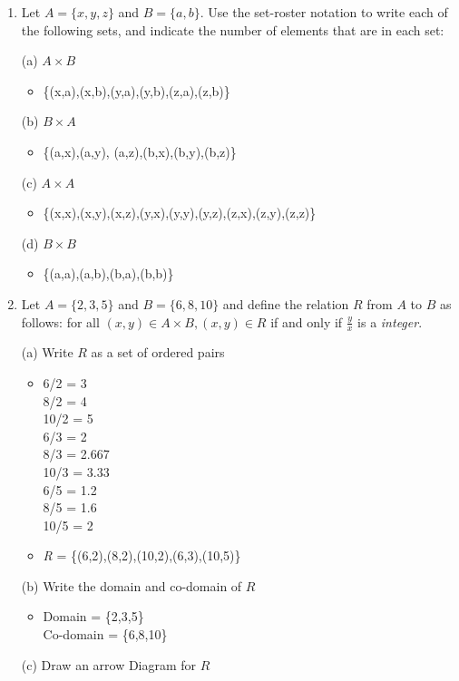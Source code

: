 \documentclass[english,12pt,legalpaper]{article}
\begin{document}
\begin{enumerate}
	\item  
	Let	$A = \{x,y,z\}$ and $B = \{a,b\}$. Use the set-roster notation to write each of the following sets, and indicate the number of elements that are in each set:
	\begin{flushleft}
		(a) $A \times B$ \\
		\begin{itemize}
			\item \{(x,a),(x,b),(y,a),(y,b),(z,a),(z,b)\}
		\end{itemize}
		(b) $B \times A$ \\ 
		\begin{itemize}
			\item \{(a,x),(a,y), (a,z),(b,x),(b,y),(b,z)\}
		\end{itemize}
		(c) $A \times A$ \\
		\begin{itemize}
			\item \{(x,x),(x,y),(x,z),(y,x),(y,y),(y,z),(z,x),(z,y),(z,z)\}
		\end{itemize}
		(d) $B \times B$
		\begin{itemize}
			\item \{(a,a),(a,b),(b,a),(b,b)\}
		\end{itemize}
	\end{flushleft}
	
	
	\item
	Let $A = \{2,3,5\}$ and $B = \{6,8,10\}$ and define the relation $\textit{R}$ from $A$ to $B$ as follows: for all $(x,y) \in A \times B, (x,y) \in \textit{R}$ if and only if $\frac{y}{x}$ is a \textit{integer}.
	\begin{flushleft}
	(a) Write $\textit{R}$ as a set of ordered pairs 
	\begin{itemize}
		\item 
		6/2 = 3 \\ 
		8/2 = 4 \\
		10/2 = 5 \\
		6/3 = 2 \\
		8/3 = 2.667 \\
		10/3 = 3.33 \\
		6/5 = 1.2\\ 
		8/5 = 1.6 \\
		10/5 = 2 \\ 
		
		\item \textit{R} = \{(6,2),(8,2),(10,2),(6,3),(10,5)\}
	\end{itemize}
	(b) Write the domain and co-domain of $\textit{R}$ \\
	\begin{itemize}
		\item Domain = \{2,3,5\} \\
		Co-domain  = \{6,8,10\} \\
	\end{itemize}
	(c) Draw an arrow Diagram for $\textit{R}$
		

\end{flushleft}
\end{enumerate}
\end{document}
